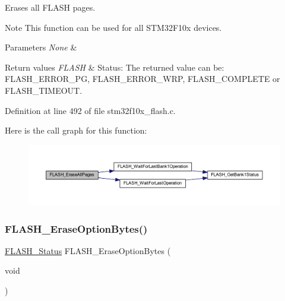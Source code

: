 Erases all F\+L\+A\+SH pages. 

\begin{DoxyNote}{Note}
This function can be used for all S\+T\+M32\+F10x devices. 
\end{DoxyNote}

\begin{DoxyParams}{Parameters}
{\em None} & \\
\hline
\end{DoxyParams}

\begin{DoxyRetVals}{Return values}
{\em F\+L\+A\+SH} & Status\+: The returned value can be\+: F\+L\+A\+S\+H\+\_\+\+E\+R\+R\+O\+R\+\_\+\+PG, F\+L\+A\+S\+H\+\_\+\+E\+R\+R\+O\+R\+\_\+\+W\+RP, F\+L\+A\+S\+H\+\_\+\+C\+O\+M\+P\+L\+E\+TE or F\+L\+A\+S\+H\+\_\+\+T\+I\+M\+E\+O\+UT. \\
\hline
\end{DoxyRetVals}


Definition at line 492 of file stm32f10x\+\_\+flash.\+c.

Here is the call graph for this function\+:
\nopagebreak
\begin{figure}[H]
\begin{center}
\leavevmode
\includegraphics[width=350pt]{group___f_l_a_s_h___exported___functions_gab2e6dea62c72b3e47c17512579d37498_cgraph}
\end{center}
\end{figure}
\mbox{\label{group___f_l_a_s_h___exported___functions_ga152768609e85d74a9d8474be8dc2874b}} 
\subsubsection{\texorpdfstring{F\+L\+A\+S\+H\+\_\+\+Erase\+Option\+Bytes()}{FLASH\_EraseOptionBytes()}}
{\footnotesize\ttfamily \hyperlink{group___f_l_a_s_h___exported___types_gadc63a6f3404ff1f71229a66915e9cdc0}{F\+L\+A\+S\+H\+\_\+\+Status} F\+L\+A\+S\+H\+\_\+\+Erase\+Option\+Bytes (\begin{DoxyParamCaption}\item[{void}]{ }\end{DoxyParamCaption})}



